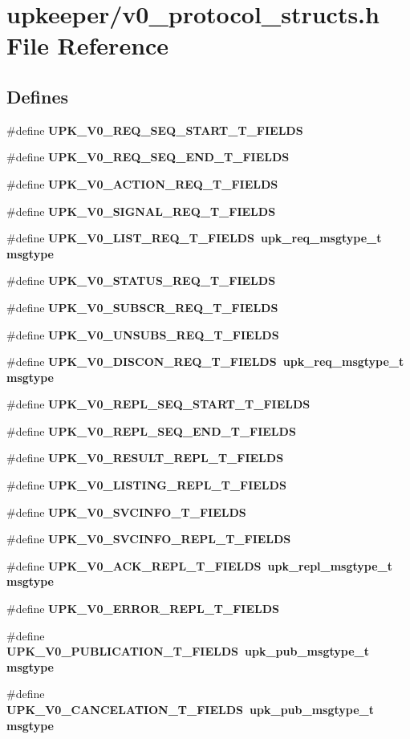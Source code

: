\section{upkeeper/v0\_\-protocol\_\-structs.h File Reference}
\label{v0__protocol__structs_8h}
\subsection*{Defines}
\begin{CompactItemize}
\item 
\#define \bf{UPK\_\-V0\_\-REQ\_\-SEQ\_\-START\_\-T\_\-FIELDS}
\item 
\#define \bf{UPK\_\-V0\_\-REQ\_\-SEQ\_\-END\_\-T\_\-FIELDS}
\item 
\#define \bf{UPK\_\-V0\_\-ACTION\_\-REQ\_\-T\_\-FIELDS}
\item 
\#define \bf{UPK\_\-V0\_\-SIGNAL\_\-REQ\_\-T\_\-FIELDS}
\item 
\#define \bf{UPK\_\-V0\_\-LIST\_\-REQ\_\-T\_\-FIELDS}~\bf{upk\_\-req\_\-msgtype\_\-t}       msgtype
\item 
\#define \bf{UPK\_\-V0\_\-STATUS\_\-REQ\_\-T\_\-FIELDS}
\item 
\#define \bf{UPK\_\-V0\_\-SUBSCR\_\-REQ\_\-T\_\-FIELDS}
\item 
\#define \bf{UPK\_\-V0\_\-UNSUBS\_\-REQ\_\-T\_\-FIELDS}
\item 
\#define \bf{UPK\_\-V0\_\-DISCON\_\-REQ\_\-T\_\-FIELDS}~\bf{upk\_\-req\_\-msgtype\_\-t}       msgtype
\item 
\#define \bf{UPK\_\-V0\_\-REPL\_\-SEQ\_\-START\_\-T\_\-FIELDS}
\item 
\#define \bf{UPK\_\-V0\_\-REPL\_\-SEQ\_\-END\_\-T\_\-FIELDS}
\item 
\#define \bf{UPK\_\-V0\_\-RESULT\_\-REPL\_\-T\_\-FIELDS}
\item 
\#define \bf{UPK\_\-V0\_\-LISTING\_\-REPL\_\-T\_\-FIELDS}
\item 
\#define \bf{UPK\_\-V0\_\-SVCINFO\_\-T\_\-FIELDS}
\item 
\#define \bf{UPK\_\-V0\_\-SVCINFO\_\-REPL\_\-T\_\-FIELDS}
\item 
\#define \bf{UPK\_\-V0\_\-ACK\_\-REPL\_\-T\_\-FIELDS}~\bf{upk\_\-repl\_\-msgtype\_\-t}      msgtype
\item 
\#define \bf{UPK\_\-V0\_\-ERROR\_\-REPL\_\-T\_\-FIELDS}
\item 
\#define \bf{UPK\_\-V0\_\-PUBLICATION\_\-T\_\-FIELDS}~\bf{upk\_\-pub\_\-msgtype\_\-t}       msgtype
\item 
\#define \bf{UPK\_\-V0\_\-CANCELATION\_\-T\_\-FIELDS}~\bf{upk\_\-pub\_\-msgtype\_\-t}       msgtype
\end{CompactItemize}


